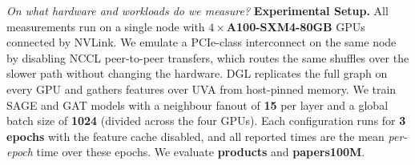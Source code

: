 \documentclass[11pt]{report}
\newcommand{\paraq}[1]{{\color{blue}\textit{#1}}\quad}
\begin{document}
\paraq{On what hardware and workloads do we measure?}
\textbf{Experimental Setup.} All measurements run on a single node with $4{\times}$\textbf{A100-SXM4-80GB} GPUs
connected by NVLink. We emulate a PCIe-class interconnect on the same node by disabling NCCL
peer-to-peer transfers, which routes the same shuffles over the slower path without changing the
hardware.
DGL replicates the full graph on every GPU and gathers features over UVA from host-pinned memory.
We train SAGE and GAT models with a neighbour fanout of \textbf{15} per layer and a
global batch size of \textbf{1024} (divided across the four GPUs). Each configuration runs for \textbf{3 epochs} with the feature cache disabled, and all
reported times are the mean \emph{per-epoch} time over these epochs. We evaluate
\textbf{products} and \textbf{papers100M}.



\FloatBarrier  %






\end{document}
